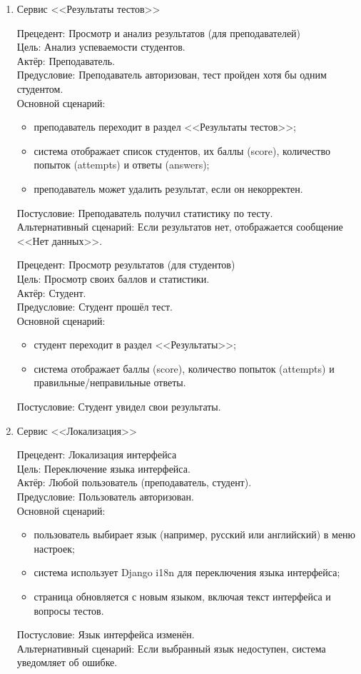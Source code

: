 \begin{enumerate}
	\item {Сервис <<Результаты тестов>>}
	
	{Прецедент: Просмотр и анализ результатов (для преподавателей)} \\
	{Цель}: Анализ успеваемости студентов. \\
	{Актёр}: Преподаватель. \\
	{Предусловие}: Преподаватель авторизован, тест пройден хотя бы одним студентом. \\
	{Основной сценарий}:
	\begin{itemize}
		\item преподаватель переходит в раздел <<Результаты тестов>>;
		\item система отображает список студентов, их баллы (score), количество попыток (attempts) и ответы (answers);
		\item преподаватель может удалить результат, если он некорректен.
	\end{itemize}
	{Постусловие}: Преподаватель получил статистику по тесту. \\
	{Альтернативный сценарий}: Если результатов нет, отображается сообщение <<Нет данных>>.
	
	{Прецедент: Просмотр результатов (для студентов)} \\
	{Цель}: Просмотр своих баллов и статистики. \\
	{Актёр}: Студент. \\
	{Предусловие}: Студент прошёл тест. \\
	{Основной сценарий}:
	\begin{itemize}
		\item студент переходит в раздел <<Результаты>>;
		\item система отображает баллы (score), количество попыток (attempts) и правильные/неправильные ответы.
	\end{itemize}
	{Постусловие}: Студент увидел свои результаты.
	
	\item {Сервис <<Локализация>>}
	
	{Прецедент: Локализация интерфейса} \\
	{Цель}: Переключение языка интерфейса. \\
	{Актёр}: Любой пользователь (преподаватель, студент). \\
	{Предусловие}: Пользователь авторизован. \\
	{Основной сценарий}:
	\begin{itemize}
		\item пользователь выбирает язык (например, русский или английский) в меню настроек;
		\item система использует Django i18n для переключения языка интерфейса;
		\item страница обновляется с новым языком, включая текст интерфейса и вопросы тестов.
	\end{itemize}
	{Постусловие}: Язык интерфейса изменён. \\
	{Альтернативный сценарий}: Если выбранный язык недоступен, система уведомляет об ошибке.
	

\end{enumerate}
